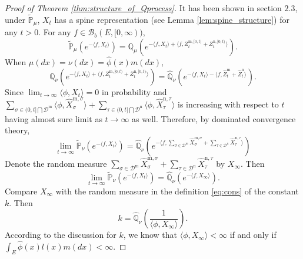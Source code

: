 \documentclass[12pt,a4paper]{amsart}
\numberwithin{equation}{section}
\theoremstyle{plain}
\theoremstyle{definition}
\begin{document}
\begin{proof}[Proof of Theorem \ref{thm:structure_of_Qprocess}]
  It has been shown in section $2.3$, under $\widetilde{\mathbb P}_\mu$,  $X_t$ has a spine representation
  (see Lemma \ref{lem:spine_structure}) for any $t>0$.  For any $f\in\mathcal B_b(E,[0,\infty))$,
  \[
    \widetilde {\mathbb P}_{\mu}\left(e^{-\langle f, X_t\rangle }\right)=\mathbb Q_{\mu}\left(e^{-\langle f, X_t\rangle+\langle f, Z^{{\mathrm m},[0,t)}_t+Z^{{\mathrm n},[0,t)}_t\rangle }\right).
  \]
  When $\mu(dx)=\nu(dx)=\widehat\phi(x)m(dx)$,
  \[
    \mathbb Q_{\nu}\left(e^{-\langle f, X_t\rangle+\langle f, Z^{{\mathrm m},[0,t)}_t+Z^{{\mathrm n},[0,t)}_t\rangle }\right)=\widehat{\mathbb Q}_{\nu}\left(e^{-\langle f, X_t\rangle-\langle f, \widehat Z^{{\mathrm m}}_t+\widehat Z^{{\mathrm n}}_t\rangle }\right).
  \]
  Since $\lim_{t\to\infty}\langle\phi, X_{t}\rangle=0$ in probability and $\sum_{\sigma\in(0, t]\bigcap\mathcal D^{\mathrm m}}\langle \phi, \widehat X_{\sigma}^{{\mathrm m},\sigma}\rangle +\sum_{\tau\in (0, t]\bigcap \mathcal D^{\mathrm n}}\langle \phi, \widehat X_{\tau}^{{\mathrm n},\tau}\rangle $ is increasing with respect to $t$ having almost sure limit as $t\to\infty$ as well.  Therefore, by dominated convergence theory,
  \[
    \lim_{t\to\infty}\widetilde {\mathbb P}_{\nu}\left(e^{-\langle f, X_t\rangle }\right)=\widehat{\mathbb Q}_{\nu}\left(e^{-\langle f,\sum_{\sigma\in\mathcal D^{\mathrm m}}\widehat X^{{\mathrm m},\sigma}_\sigma+\sum_{\tau\in\mathcal D^{\mathrm n}}\widehat X^{{\mathrm n},\tau}_\tau\rangle }\right)
  \]
  Denote the random measure $\sum_{\sigma\in\mathcal D^{\mathrm m}}\widehat X^{{\mathrm m},\sigma}_\sigma+\sum_{\tau\in\mathcal D^{\mathrm n}}\widehat X^{{\mathrm n},\tau}_\tau$ by $X_\infty$.
  Then
  \[
    \lim_{t\to\infty}\widetilde {\mathbb P}_{\nu}\left(e^{-\langle f, X_t\rangle }\right)=\widehat{\mathbb Q}_\nu \left(e^{-\langle f,X_\infty\rangle}\right).
  \]
  Compare $X_\infty$ with the random measure in the definition \eqref{eq:cons} of the constant $k$.  Then
  $$
  k=\widehat{\mathbb Q}_\nu\left(\dfrac{1}{\langle\phi, X_\infty\rangle}\right).
  $$
  According to the discussion for $k$, we know that $\langle\phi, X_\infty\rangle<\infty$ if and only if $\int_E\widehat\phi(x)l(x)m(dx)<\infty$.



\end{proof}
\end{document}
